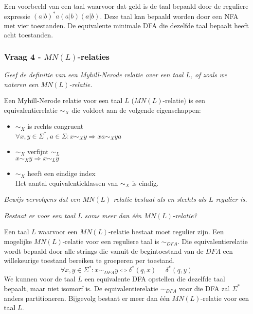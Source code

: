 Een voorbeeld van een taal waarvoor dat geld is de taal bepaald door de reguliere expressie $(a|b)^*a(a|b)(a|b)$. Deze taal kan bepaald worden door een NFA met vier toestanden. De equivalente minimale DFA die dezelfde taal bepaalt heeft acht toestanden.

\subsubsection{Vraag 4 - $MN(L)$-relaties}

\textit{Geef de definitie van een Myhill-Nerode relatie over een taal $L$, of zoals we noteren een $MN(L)$-relatie.}

Een Myhill-Nerode relatie voor een taal $L$ ($MN(L)$-relatie) is een equivalentierelatie $\sim_X$ die voldoet aan de volgende eigenschappen:
  \begin{itemize}
  \item $\sim_X$ is rechts congruent\\$\forall x, y \in \Sigma^*, a \in \Sigma: x \sim_X y \Rightarrow xa \sim_X ya$
  \item $\sim_X$ verfijnt $\sim_L$\\$x \sim_X y \Rightarrow x \sim_L y$
  \item $\sim_X$ heeft een eindige index\\Het aantal equivalentieklassen van $\sim_X$ is eindig.
  \end{itemize}

\textit{Bewijs vervolgens dat een $MN(L)$-relatie bestaat als en slechts als $L$ regulier is.}



\textit{Bestaat er voor een taal $L$ soms meer dan \'e\'en $MN(L)$-relatie?}

Een taal $L$ waarvoor een $MN(L)$-relatie bestaat moet regulier zijn. Een mogelijke $MN(L)$-relatie voor een reguliere taal is $\sim_{DFA}$. Die equivalentierelatie wordt bepaald door alle strings die vanuit de begintoestand van de $DFA$ een willekeurige toestand bereiken te groeperen per toestand.
\begin{equation*}
\forall x, y \in \Sigma^*: x \sim_{DFA} y \Leftrightarrow \delta^*(q, x) = \delta^*(q, y)
\end{equation*}
We kunnen voor de taal $L$ een equivalente DFA opstellen die dezelfde taal bepaalt, maar niet isomorf is. De equivalentierelatie $\sim_{DFA}$ voor die DFA zal $\Sigma^*$ anders partitioneren. Bijgevolg bestaat er meer dan \'e\'en $MN(L)$-relatie voor een taal $L$.

